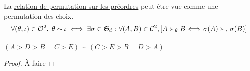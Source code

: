 \begin{proposition}
	La \hyperref[Relation de permutation sur les préordres]{relation de permutation sur les préordres} peut être vue comme une permutation des choix.
	\begin{equation}
		\forall (\theta, \iota) \in \mathcal{O}^2, \;
		\theta \sim \iota \iff
		\exists \sigma \in \mathfrak{S}_{\mathcal{C}} : \forall (A, B) \in \mathcal{C}^2,
		\left[ A \succ_\theta B \!\iff\! \sigma(A) \succ_\iota \sigma(B) \right]
	\end{equation}
\end{proposition}

\begin{exemple}
	$(A > D > B = C > E) \sim (C > E > B = D > A)$
\end{exemple}

\begin{proof}
	À faire
\end{proof}

